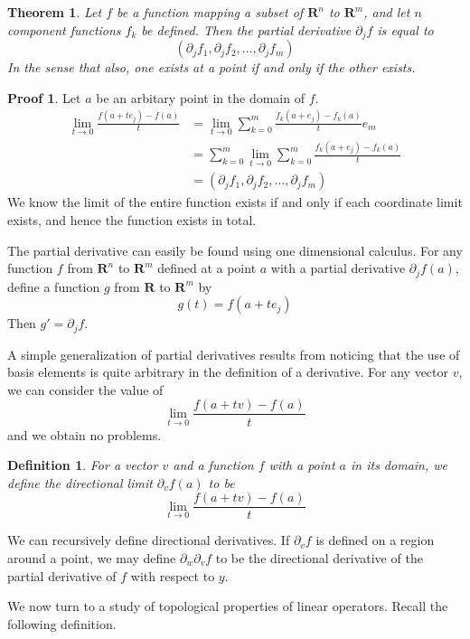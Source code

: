 \documentclass[12pt]{amsbook}
\theoremstyle{plain}
\newtheorem{definition}{Definition}
\newtheorem{theorem}{Theorem}
\theoremstyle{definition}
\newtheorem*{prf}{Proof}
\begin{document}
\begin{theorem}
  Let $f$ be a function mapping a subset of $\mathbf{R}^n$ to $\mathbf{R}^m$, and let $n$ component functions $f_k$ be defined. Then the partial derivative $\partial_j f$ is equal to
  \[ (\partial_j f_1, \partial_j f_2, \dots, \partial_j f_m) \]
  In the sense that also, one exists at a point if and only if the other exists.
\end{theorem}
\begin{prf}
  Let $a$ be an arbitary point in the domain of $f$.
  \begin{align*}
    \lim_{t \to 0} \frac{f(a + te_j) - f(a)}{t} &= \lim_{t \to 0} \sum_{k = 0}^m \frac{f_k(a + e_j) - f_k(a)}{t}e_m\\
    &= \sum_{k = 0}^m \lim_{t \to 0} \sum_{k = 0}^m \frac{f_k(a + e_j) - f_k(a)}{t}\\
    &= (\partial_j f_1, \partial_j f_2, \dots, \partial_j f_m)
  \end{align*}
  We know the limit of the entire function exists if and only if each coordinate limit exists, and hence the function exists in total.
\end{prf}

The partial derivative can easily be found using one dimensional calculus. For any function $f$ from $\mathbf{R}^n$ to $\mathbf{R}^m$ defined at a point $a$ with a partial derivative $\partial_j f(a)$, define a function $g$ from $\mathbf{R}$ to $\mathbf{R}^m$ by
%
\[ g(t) = f(a + te_j) \]
%
Then $g' = \partial_j f$.

A simple generalization of partial derivatives results from noticing that the use of basis elements is quite arbitrary in the definition of a derivative. For any vector $v$, we can consider the value of
%
\[ \lim_{t \to 0} \frac{f(a + tv) - f(a)}{t} \]
%
and we obtain no problems.

\begin{definition}
  For a vector $v$ and a function $f$ with a point $a$ in its domain, we define the directional limit $\partial_v f(a)$ to be
  \[ \lim_{t \to 0} \frac{f(a + tv) - f(a)}{t} \]
\end{definition}

We can recursively define directional derivatives. If $\partial_v f$ is defined on a region around a point, we may define $\partial_w \partial_v f$ to be the directional derivative of the partial derivative of $f$ with respect to $y$.

We now turn to a study of topological properties of linear operators. Recall the following definition.
\end{document}
